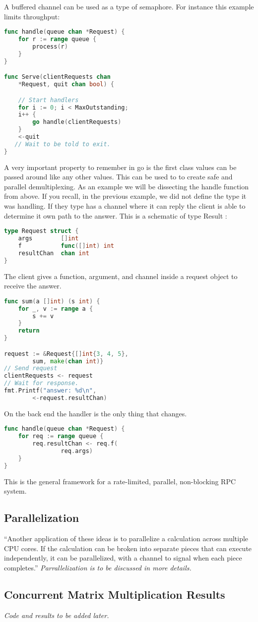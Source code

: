	A buffered channel can be used as a type of semaphore. For instance this example limits throughput:
\begin{lstlisting}[language=Go]
func handle(queue chan *Request) {
    for r := range queue {
        process(r)
    }
}

func Serve(clientRequests chan 
	*Request, quit chan bool) {

    // Start handlers
    for i := 0; i < MaxOutstanding;
    i++ {
        go handle(clientRequests)
    }
    <-quit 
   // Wait to be told to exit.
} 
\end{lstlisting}
A very important property to remember in go is the first class values can be passed around like any other values. This can be used to to create safe and parallel demultiplexing. As an example we will be dissecting the handle function from above. If you recall, in the previous example, we did not define the type it was handling. If they type has a channel where it can reply the client is able to determine it own path to the answer. This is a schematic of type Result :
\begin{lstlisting}[language=Go]
type Request struct {
    args        []int
    f           func([]int) int
    resultChan  chan int
} 
\end{lstlisting}
The client gives a function, argument, and channel inside a request object to receive the answer.
\begin{lstlisting}[language=Go]
func sum(a []int) (s int) {
    for _, v := range a {
        s += v
    }
    return
}

request := &Request{[]int{3, 4, 5}, 
	 	sum, make(chan int)}
// Send request
clientRequests <- request
// Wait for response.
fmt.Printf("answer: %d\n",
		<-request.resultChan)
\end{lstlisting}
On the back end the handler is the only thing that changes. 
\begin{lstlisting}[language=Go]
func handle(queue chan *Request) {
    for req := range queue {
        req.resultChan <- req.f(
			    req.args)
    }
} 
\end{lstlisting}
This is the general framework for a rate-limited, parallel, non-blocking RPC system.
\subsection{Parallelization}
“Another application of these ideas is to parallelize a calculation across multiple CPU cores. If the calculation can be broken into separate pieces that can execute independently, it can be parallelized, with a channel to signal when each piece completes.”\cite{website:go-lang-documentation}
\emph{Parrallelization is to be discussed in more details.}
\subsection{Concurrent Matrix Multiplication Results}
\emph{Code and results to be added later.}

